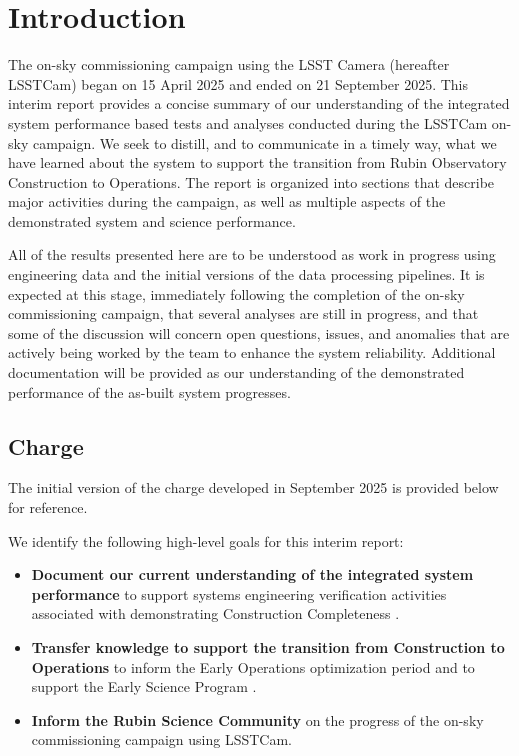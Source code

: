 \section{Introduction}
\label{sec:introduction}

The \VeraRubinObservatory on-sky commissioning campaign using the LSST Camera (hereafter LSSTCam) began on 15 April 2025 and ended on 21 September 2025.
This interim report provides a concise summary of our understanding of the integrated system performance based tests and analyses conducted during the LSSTCam on-sky campaign.
We seek to distill, and to communicate in a timely way, what we have learned about the system to support the transition from Rubin Observatory Construction to Operations.
The report is organized into sections that describe major activities during the campaign, as well as multiple aspects of the demonstrated system and science performance.

\begin{warning}
All of the results presented here are to be understood as work in progress using engineering data and the
initial versions of the data processing pipelines.
It is expected at this stage, immediately following the completion of the on-sky commissioning campaign, that several analyses are still in progress, and that some of the discussion will concern open questions, issues, and anomalies that are actively being worked by the team to enhance the system reliability.
Additional documentation will be provided as our understanding of the demonstrated performance of the as-built system progresses.
\end{warning}

\subsection{Charge}

\begin{note}
    The initial version of the charge developed in September 2025 is provided below for reference.
\end{note}

We identify the following high-level goals for this interim report:

\begin{itemize}

    \item \textbf{Document our current understanding of the integrated system performance} to support systems engineering verification activities associated with demonstrating Construction Completeness .

    \item \textbf{Transfer knowledge to support the transition from Construction to Operations} to inform the Early Operations optimization period and to support the Early Science Program .

    \item \textbf{Inform the Rubin Science Community} on the progress of the on-sky commissioning campaign using LSSTCam.

\end{itemize}


